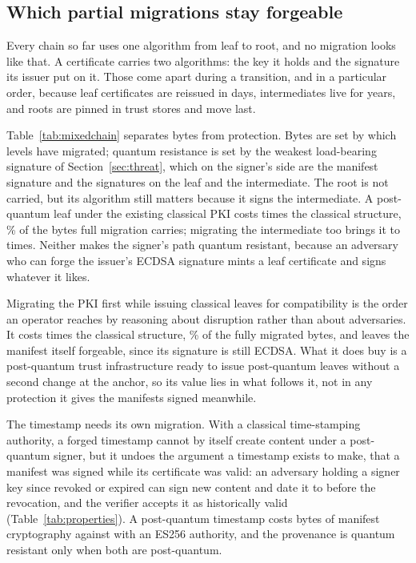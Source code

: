 \subsection{Which partial migrations stay forgeable}
\label{sec:mixedchain}

Every chain so far uses one algorithm from leaf to root, and no migration
looks like that. A certificate carries two algorithms: the key it holds and
the signature its issuer put on it. Those come apart during a transition, and
in a particular order, because leaf certificates are reissued in days,
intermediates live for years, and roots are pinned in trust stores and move
last.



Table~\ref{tab:mixedchain} separates bytes from protection. Bytes are set by
which levels have migrated; quantum resistance is set by the weakest
load-bearing signature of Section~\ref{sec:threat}, which on the signer's side
are the manifest signature and the signatures on the leaf and the
intermediate. The root is not carried, but its algorithm still matters because
it signs the intermediate. A post-quantum
leaf under the existing classical PKI costs \NmixLeafMig{} times the
classical structure, \NmixPctFullLeafMig\% of the bytes full migration carries;
migrating the intermediate too brings it to \NmixLeafInt{} times. Neither
makes the signer's path quantum resistant, because an adversary who can forge
the issuer's ECDSA signature mints a leaf certificate and signs whatever it
likes.

Migrating the PKI first while issuing classical leaves for compatibility is
the order an operator reaches by reasoning about disruption rather than about
adversaries. It costs \NmixPkiFirst{} times the classical structure,
\NmixPctFullPkiFirst\% of the fully migrated bytes, and leaves the manifest itself
forgeable, since its signature is still ECDSA. What it does buy is a
post-quantum trust infrastructure ready to issue post-quantum leaves without a
second change at the anchor, so its value lies in what follows it, not in any
protection it gives the manifests signed meanwhile.

The timestamp needs its own migration. With a classical time-stamping
authority, a forged timestamp cannot by itself create content under a
post-quantum signer, but it undoes the argument a timestamp exists to make,
that a manifest was signed while its certificate was valid: an adversary
holding a signer key since revoked or expired can sign new content and date it
to before the revocation, and the verifier accepts it as historically valid
(Table~\ref{tab:properties}). A post-quantum timestamp costs \NmixWholeFullPq{} bytes of manifest
cryptography against \NmixWholeFullEs{} with an ES256 authority, and the
provenance is quantum resistant only when both are post-quantum.

